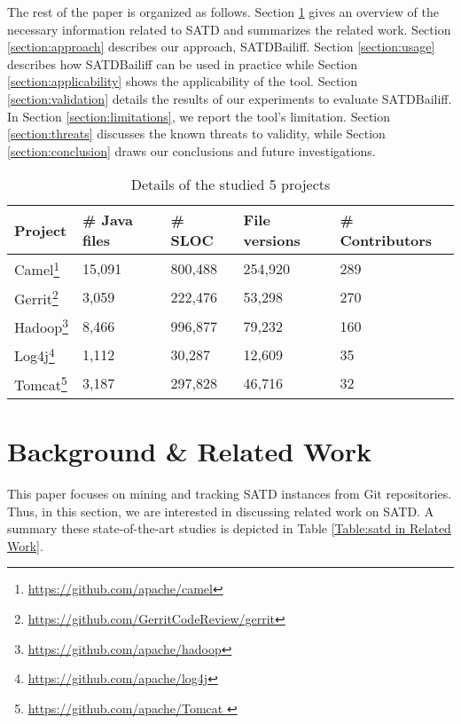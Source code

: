 \documentclass[3p]{elsarticle}
\newcommand{\approach}{SATDBailiff\xspace}
\begin{document}
The rest of the paper is organized as follows. Section \ref{section:background} gives an overview of the necessary information related to SATD and summarizes the related work. Section \ref{section:approach} describes our approach, \approach. Section \ref{section:usage} describes how \approach  can be used in practice while Section \ref{section:applicability} shows the applicability of the tool. Section \ref{section:validation} details the results of our experiments to evaluate \approach. In Section \ref{section:limitations}, we report the tool's limitation. Section \ref{section:threats} discusses the known threats to validity, while Section \ref{section:conclusion} draws our conclusions and future investigations.%

\begin{table}
    \centering
    \caption{Details of the studied 5 projects}
    \begin{tabular}{ |p{4em}|R{5em}|R{5.2em}|R{4.8em}|R{4.8em}|   }
     \hline
     \textbf{Project} & \textbf{\# Java files} & \textbf{\# SLOC} &  \textbf{File versions}&  \textbf{\# Contributors}\\
     \hline 
     Camel\footnote{\url{https://github.com/apache/camel}}          & 15,091  & 800,488  &  254,920 & 289\\
     Gerrit\footnote{\url{https://github.com/GerritCodeReview/gerrit}}         & 3,059  & 222,476  & 53,298 &  270\\
     Hadoop\footnote{\url{https://github.com/apache/hadoop}}         & 8,466  &  996,877  & 79,232 & 160 \\
     Log4j\footnote{\url{https://github.com/apache/log4j}}          & 1,112   & 30,287   &12,609 & 35 \\ 
     Tomcat\footnote{\url{https://github.com/apache/Tomcat }}         & 3,187  &  297,828  &  46,716 & 32 \\
    
     \hline
    \end{tabular}
    
    \label{tab:Studied Projects}
\end{table}
\section{Background \& Related Work}
\label{section:background}

This paper focuses on mining and tracking SATD instances from Git repositories. Thus, in this section, we are interested in discussing related work on SATD. A 
summary these state-of-the-art studies is depicted in Table \ref{Table:satd in Related Work}.
\end{document}
